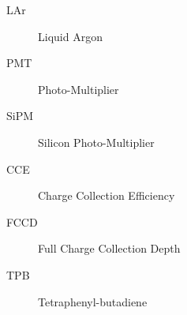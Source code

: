 \twocolumn

\begin{description}
  \item[LAr] Liquid Argon
  \item[PMT] Photo-Multiplier
  \item[SiPM] Silicon Photo-Multiplier
  \item[CCE] Charge Collection Efficiency
  \item[FCCD] Full Charge Collection Depth
  \item[TPB] Tetraphenyl-butadiene
\end{description}

\onecolumn
